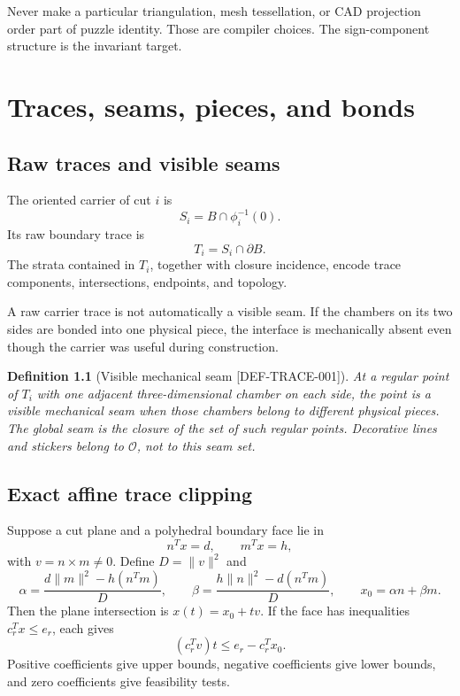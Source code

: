 \documentclass[11pt,openany]{book}
\newcommand{\claimid}[1]{\textnormal{\sffamily\footnotesize[#1]}}
\theoremstyle{polyplain}
\theoremstyle{polydef}
\newtheorem{definition}[theorem]{Definition}
\begin{document}
\begin{designrule}
Never make a particular triangulation, mesh tessellation, or CAD projection order part of puzzle identity. Those are compiler choices. The sign-component structure is the invariant target.
\end{designrule}

\chapter{Traces, seams, pieces, and bonds}
\label{chap:traces-pieces}

\section{Raw traces and visible seams}

The oriented carrier of cut $i$ is
\[
S_i=B\cap\phi_i^{-1}(0).
\]
Its raw boundary trace is
\[
T_i=S_i\cap\partial B.
\]
The strata contained in $T_i$, together with closure incidence, encode trace components, intersections, endpoints, and topology.

A raw carrier trace is not automatically a visible seam. If the chambers on its two sides are bonded into one physical piece, the interface is mechanically absent even though the carrier was useful during construction.

\begin{definition}[Visible mechanical seam \claimid{DEF-TRACE-001}]
\label{def:visible-seam}
At a regular point of $T_i$ with one adjacent three-dimensional chamber on each side, the point is a \emph{visible mechanical seam} when those chambers belong to different physical pieces. The global seam is the closure of the set of such regular points. Decorative lines and stickers belong to $\mathcal O$, not to this seam set.
\end{definition}

\section{Exact affine trace clipping}

Suppose a cut plane and a polyhedral boundary face lie in
\[
n^Tx=d,
\qquad
m^Tx=h,
\]
with $v=n\times m\ne0$. Define $D=\lVert v\rVert^2$ and
\[
\alpha=\frac{d\lVert m\rVert^2-h(n^Tm)}{D},
\qquad
\beta=\frac{h\lVert n\rVert^2-d(n^Tm)}{D},
\qquad
x_0=\alpha n+\beta m.
\]
Then the plane intersection is $x(t)=x_0+tv$. If the face has inequalities $c_r^Tx\le e_r$, each gives
\[
(c_r^Tv)t\le e_r-c_r^Tx_0.
\]
Positive coefficients give upper bounds, negative coefficients give lower bounds, and zero coefficients give feasibility tests.
\end{document}
